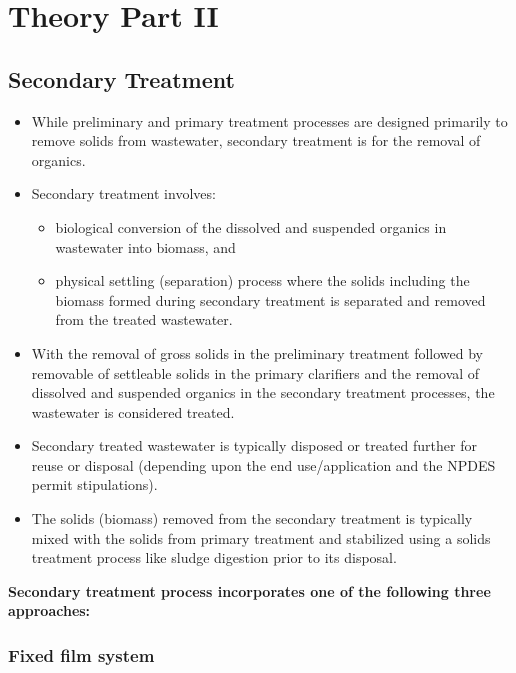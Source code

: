 
\chapter{Theory Part II}

\section{Secondary Treatment}
\begin{itemize}
\item While preliminary and primary treatment processes are designed primarily to remove solids from wastewater, secondary treatment is for the removal of organics.
\item Secondary treatment involves:
\begin{itemize}
\item biological conversion of the dissolved and suspended organics in wastewater into biomass, and
\item physical settling (separation) process where the solids including the biomass formed during secondary treatment is separated and removed from the treated wastewater.
\end{itemize}

\item With the removal of gross solids in the preliminary treatment followed by removable of settleable solids in the primary clarifiers and the removal of dissolved and suspended organics in the secondary treatment processes, the wastewater is considered treated.
\item Secondary treated wastewater is typically disposed or treated further for reuse or disposal (depending upon the end use/application and the NPDES permit stipulations).
\item The solids (biomass) removed from the secondary treatment is typically mixed with the solids from primary treatment and stabilized using a solids treatment process like sludge digestion prior to its disposal.
\end{itemize}
\vspace{1cm}

\textbf{Secondary treatment process incorporates one of the following three approaches:}


\subsection{Fixed film system}	
		
